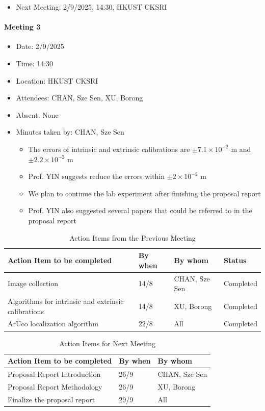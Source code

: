 \documentclass[11pt]{article}
\begin{document}
    \begin{itemize}
        \item Next Meeting: 2/9/2025, 14:30, HKUST CKSRI
    \end{itemize}
    \newpage
    \paragraph{Meeting 3}
    \begin{itemize}
        \item Date: 2/9/2025
        \item Time: 14:30
        \item Location: HKUST CKSRI
        \item Attendees: CHAN, Sze Sen, XU, Borong
        \item Absent: None
        \item Minutes taken by: CHAN, Sze Sen
        \begin{itemize}
            \item The errors of intrinsic and extrinsic calibrations are $\pm 7.1\times 10^ {- 2} $ m and $\pm 2.2\times 10^ {- 2} $ m
            \item Prof. YIN suggests reduce the errors within $\pm2\times 10^ {- 2} $ m
            \item We plan to continue the lab experiment after finishing the proposal report
            \item Prof. YIN also suggested several papers that could be referred to in the proposal report
        \end{itemize}
    \end{itemize}
    \begin{longtable}[c]{| l | l | l | l |}
        \caption{Action Items from the Previous Meeting\label{previous meeting 3}}\\ 
        \hline
        \textbf{Action Item to be completed} & \textbf{By when} & \textbf{By whom} & \textbf{Status}\\
        \hline
        Image collection & 14/8 & CHAN, Sze Sen & Completed\\
        \hline
        Algorithms for intrinsic and extrinsic calibrations & 14/8 & XU, Borong & Completed\\
        \hline
        ArUco localization algorithm & 22/8 & All & Completed\\
        \hline
    \end{longtable}
    \begin{longtable}[c]{| l | l | l |}
        \caption{Action Items for Next Meeting\label{next meeting 3}}\\ 
        \hline
        \textbf{Action Item to be completed} & \textbf{By when} & \textbf{By whom}\\
        \hline
        Proposal Report Introduction & 26/9 & CHAN, Sze Sen\\
        \hline
        Proposal Report Methodology & 26/9 & XU, Borong\\
        \hline
        Finalize the proposal report & 29/9 & All\\
        \hline
    \end{longtable}
\end{document}
